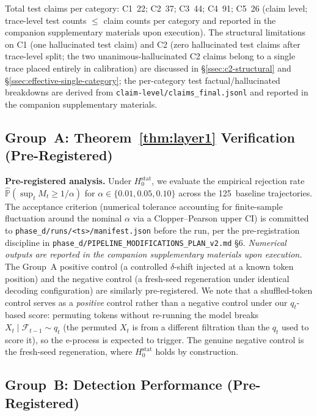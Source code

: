 \documentclass[runningheads]{llncs}
\newcommand{\Hnull}{H_0^{\text{stat}}}
\begin{document}
Total test claims per category: C1~22; C2~37; C3~44; C4~91; C5~26 (claim
level; trace-level test counts $\le$ claim counts per category and reported
in the companion supplementary materials upon execution). The structural
limitations on C1 (one hallucinated test claim) and C2 (zero hallucinated
test claims after trace-level split; the two unanimous-hallucinated C2
claims belong to a single trace placed entirely in calibration) are
discussed in \S\ref{ssec:c2-structural} and
\S\ref{ssec:effective-single-category}; the per-category test
factual/hallucinated breakdowns are derived from
\texttt{claim-level/claims\_final.jsonl} and reported in the companion
supplementary materials.

\subsection{Group~A: Theorem~\ref{thm:layer1} Verification (Pre-Registered)}
\label{ssec:results-groupA}

\textbf{Pre-registered analysis.} Under $\Hnull$, we evaluate the
empirical rejection rate $\hat{\mathbb{P}}(\sup_t M_t \ge 1/\alpha)$ for
$\alpha \in \{0.01, 0.05, 0.10\}$ across the 125~baseline trajectories.
The acceptance criterion (numerical tolerance accounting for finite-sample
fluctuation around the nominal $\alpha$ via a Clopper--Pearson upper CI)
is committed to \texttt{phase\_d/runs/<ts>/manifest.json} before the run,
per the pre-registration discipline in
\texttt{phase\_d/PIPELINE\_MODIFICATIONS\_PLAN\_v2.md} §6. \emph{Numerical
outputs are reported in the companion supplementary materials upon
execution.}
The Group~A positive control (a controlled $\delta$-shift injected at a
known token position) and the negative control (a fresh-seed regeneration
under identical decoding configuration) are similarly pre-registered. We
note that a shuffled-token control serves as a \emph{positive} control
rather than a negative control under our $q_t$-based score: permuting
tokens without re-running the model breaks
$X_t \mid \mathcal{F}_{t-1} \sim q_t$ (the permuted $X_t$ is from a
different filtration than the $q_t$ used to score it), so the e-process is
expected to trigger. The genuine negative control is the fresh-seed
regeneration, where $\Hnull$ holds by construction.

\subsection{Group~B: Detection Performance (Pre-Registered)}
\label{ssec:results-groupB}
\end{document}
